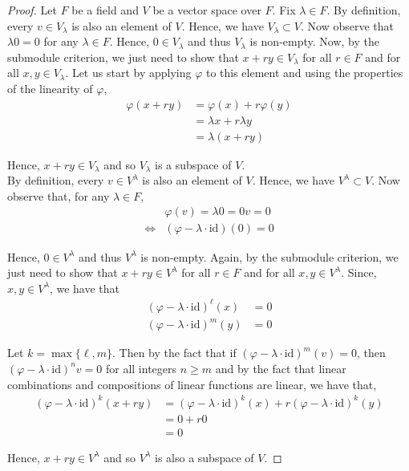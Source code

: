 \documentclass[11pt, reqno]{amsart}
\theoremstyle{plain}
\theoremstyle{definition}
\theoremstyle{example}
\def\id{\mathrm{id}}
\def\f{\varphi}
\begin{document}
\begin{proof}
Let $F$ be a field and $V$ be a vector space over $F$. Fix $\lambda \in F$. By definition, every $v \in V_{\lambda}$ is also an element of $V$. Hence, we have $V_{\lambda} \subset V$. Now observe that $\lambda 0 = 0$ for any $\lambda \in F$. Hence, $0 \in V_{\lambda}$ and thus $V_\lambda$ is non-empty. Now, by the submodule criterion, we just need to show that $x + ry \in V_{\lambda}$ for all $r \in F$ and for all $x, y \in V_{\lambda}$. Let us start by applying $\varphi$ to this element and using the properties of the linearity of $\varphi$,
\begin{align*}
\varphi(x + ry) &= \varphi(x) + r\varphi(y)\\
&= \lambda x + r \lambda y\\
&= \lambda (x + ry)
\end{align*}

Hence, $x + ry \in V_{\lambda}$ and so $V_{\lambda}$ is a subspace of $V$.\\

By definition, every $v \in V^{\lambda}$ is also an element of $V$. Hence, we have $V^{\lambda} \subset V$. Now observe that, for any $\lambda \in F$,
\begin{align*}
&\f(v) = \lambda 0 = 0v = 0\\
\iff &(\f - \lambda \cdot \id)(0) = 0
\end{align*} 

Hence, $0 \in V^{\lambda}$ and thus $V^\lambda$ is non-empty. Again, by the submodule criterion, we just need to show that $x + ry \in V^{\lambda}$ for all $r \in F$ and for all $x, y \in V^{\lambda}$. Since, $x, y \in V^{\lambda}$, we have that 
\begin{align*}
(\f - \lambda \cdot \id)^{\ell}(x) &= 0\\
(\f - \lambda \cdot \id)^{m}(y) &= 0
\end{align*}

Let $k = \max\{\ell, m\}$. Then by the fact that if $(\f - \lambda \cdot \id)^m (v) = 0$, then $(\f - \lambda \cdot \id)^n v = 0$ for all integers $n \ge m$ and by the fact that linear combinations and compositions of linear functions are linear, we have that,
\begin{align*}
(\f - \lambda \cdot \id)^k (x + ry) &= (\f - \lambda \cdot \id)^k(x) + r (\f - \lambda \cdot \id)^k(y)\\
&= 0 + r0\\
&= 0
\end{align*}

Hence, $x + ry \in V^{\lambda}$ and so $V^{\lambda}$ is also a subspace of $V$.
\end{proof}
\end{document}
